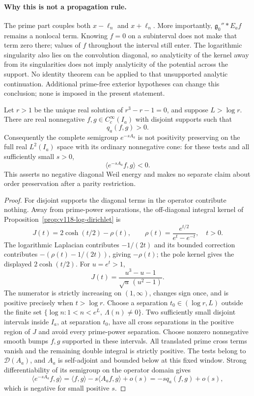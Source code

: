\paragraph{Why this is not a propagation rule.}
The prime part couples both $x-\ell_n$ and $x+\ell_n$.
More importantly, $\mathfrak g_0''*E_af$ remains a nonlocal term.
Knowing $f=0$ on a subinterval does not make that term zero there;
values of $f$ throughout the interval still enter. The logarithmic
singularity also lies on the convolution diagonal, so analyticity
of the kernel away from its singularities does not imply analyticity
of the potential across the support. No identity theorem can be
applied to that unsupported analytic continuation. Additional
prime-free exterior hypotheses can change this conclusion; none
is imposed in the present statement.

\begin{proposition}
\label{prop:ns55-nonpositive-semigroup}
Let $r>1$ be the unique real solution of $r^3-r-1=0$, and suppose
$L>\log r$. There are real nonnegative
$f,g\in C_c^\infty(I_a)$ with disjoint supports such that
\begin{equation}\label{eq:ns55-positive-cross}
 q_a(f,g)>0.
\end{equation}
Consequently the complete semigroup $e^{-sA_a}$ is not positivity
preserving on the full real $L^2(I_a)$ space with its ordinary
nonnegative cone: for these tests and all sufficiently small $s>0$,
\[
 \langle e^{-sA_a}f,g\rangle<0.
\]
This asserts no negative diagonal Weil energy and makes no separate
claim about order preservation after a parity restriction.
\end{proposition}
\begin{proof}
For disjoint supports the diagonal terms in the operator contribute
nothing. Away from prime-power separations, the off-diagonal integral
kernel of Proposition~\ref{prop:v118-log-dirichlet} is
\[
 J(t)=2\cosh(t/2)-\rho(t),\qquad
 \rho(t)=\frac{e^{t/2}}{e^t-e^{-t}},\quad t>0.
\]
The logarithmic Laplacian contributes $-1/(2t)$ and its bounded
correction contributes $-(\rho(t)-1/(2t))$, giving $-\rho(t)$;
the pole kernel gives the displayed $2\cosh(t/2)$.
For $u=e^t>1$,
\[
 J(t)=\frac{u^3-u-1}{\sqrt u\,(u^2-1)}.
\]
The numerator is strictly increasing on $(1,\infty)$, changes sign
once, and is positive precisely when $t>\log r$.
Choose a separation $t_0\in(\log r,L)$ outside the finite set
$\{\log n:1<n<e^L,\ \Lambda(n)\ne0\}$. Two sufficiently small
disjoint intervals inside $I_a$, at separation $t_0$, have all
cross separations in the positive region of $J$ and avoid every
prime-power separation. Choose nonzero nonnegative smooth bumps
$f,g$ supported in these intervals. All translated prime cross
terms vanish and the remaining double integral is strictly positive.
The tests belong to $\mathcal D(A_a)$, and $A_a$ is self-adjoint
and bounded below at this fixed window. Strong differentiability
of its semigroup on the operator domain gives
\[
 \langle e^{-sA_a}f,g\rangle
 =\langle f,g\rangle-s\langle A_af,g\rangle+o(s)
 =-s q_a(f,g)+o(s),
\]
which is negative for small positive $s$.
\end{proof}

